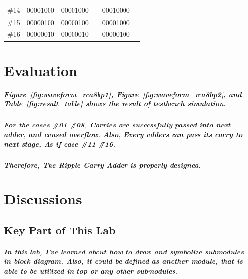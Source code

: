 \documentclass{report}
\begin{document}
\begin{longtable}[here,width=\textwidth]{|c|c|c|c|c|c|}
                \#14 & 00001000                  & 00001000                  &                    & 00010000 &                    \\ \cline{1-3} \cline{5-5}
                \#15 & 00000100                  & 00000100                  &                    & 00001000 &                    \\ \cline{1-3} \cline{5-5}
                \#16 & 00000010                  & 00000010                  &                    & 00000100 &                    \\ \hline
            \end{longtable}

    \chapter{Evaluation}
        \paragraph{\normalfont Figure~\ref{fig:waveform_rca8bp1}, Figure~\ref{fig:waveform_rca8bp2}, and Table~\ref{fig:result_table} shows the result of testbench simulation.  }

        \paragraph{\normalfont For the cases \#01 \~ \#08, Carries are successfully passed into next adder, and caused overflow. Also, Every adders can pass its carry to next stage, As if case \#11 \~ \#16.}
    
        \paragraph{\normalfont Therefore, The Ripple Carry Adder is properly designed.}        
    \chapter{Discussions}
        \section{Key Part of This Lab}
            \paragraph{\normalfont In this lab, I've learned about how to draw and symbolize submodules in block diagram. Also, it could be defined as another module, that is able to be utilized in top or any other submodules.}
\end{document}
